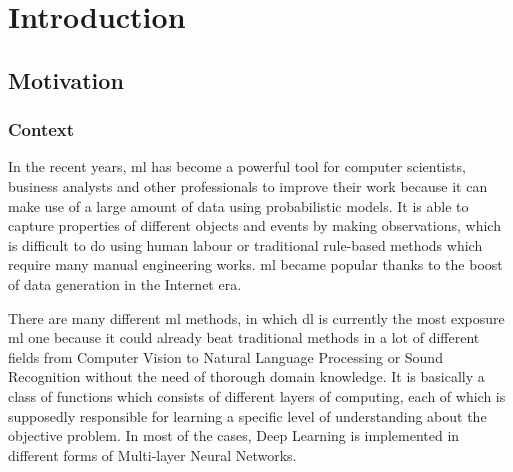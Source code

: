 \chapter{Introduction\label{cha:introduction}}
\section{Motivation\label{sec:moti}}
\subsection{Context}
In the recent years, \acrfull{ml} has become a powerful tool for computer scientists,
business analysts and other professionals to improve their work because it can make use of
a large amount of data using probabilistic models. It is able to capture properties of
different objects and events by making observations, which is difficult to do using human
labour or traditional rule-based methods which require many manual engineering works.
\acrshort{ml} became popular thanks to the boost of data generation in the Internet era. 



There are many different \acrshort{ml} methods, in which \acrfull{dl} is currently the
most exposure \acrshort{ml} one because it could already beat traditional methods in a
lot of different fields from Computer Vision to Natural Language Processing or Sound
Recognition without the need of thorough domain knowledge. It is basically a class of
functions which consists of different layers of computing, each of which is supposedly
responsible for learning a specific level of understanding about the objective problem. In
most of the cases, Deep Learning is implemented in different forms of Multi-layer Neural
Networks.

